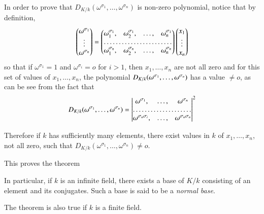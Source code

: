 In order to prove that $D_{K/k}(\omega^{\sigma_1}, \ldots,
\omega^{\sigma_n})$ is non-zero polynomial, notice that by definition, 
$$
\begin{pmatrix}
\omega^{\sigma_1}\\
\vdots\\
\omega^{\sigma_n}
\end{pmatrix}
=
\begin{pmatrix}
\omega^{\sigma_1}_1, & \omega^{\sigma_1}_2, & \ldots, & \omega^{\sigma_1}_n\\
\hdotsfor{4}\\
\omega^{\sigma_n}_1, &  \omega^{\sigma_n}_2, &  \ldots, & \omega^{\sigma_n}_n\\
\end{pmatrix}
\begin{pmatrix}
x_1\\
\vdots\\
x_n
\end{pmatrix}
$$
so that if $\omega^{\sigma_1}=1$ and $\omega^{\sigma_i}=o$ for $i>1$,
then $x_1, \ldots, x_n$ are not all zero and for this set of values of
$x_1, \ldots, x_n$, the polynomial $D_{K/k}(\omega^{\sigma_1},\break \ldots,
\omega^{\sigma_n})$ has a value $\neq o$, as can be see from the fact
that  
$$
D_{K/k}(\omega^{\sigma_1}, \ldots, \omega^{\sigma_n})=
\begin{vmatrix}
\omega^{\sigma_1}, & \ldots, & \omega^{\sigma_n}\\
\hdotsfor{3}\\
\omega^{\sigma_n\sigma_i}, & \ldots, & \omega^{\sigma_n \sigma_n}
\end{vmatrix}^2
$$

Therefore if $k$ has sufficiently many elements, there exist values in
$k$ of $x_1, \ldots, x_n$, not all zero, such that
$D_{K/k}(\omega^{\sigma_1}, \ldots, \omega^{\sigma_n})\neq o$.  

This proves the theorem

In particular, if $k$ is an infinite field, there exists a base of
$K/k$ consisting of an element and its conjugates. Such a base is said
to be a \textit{normal base}. 

The theorem is also true if $k$ is a finite field.

